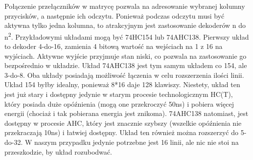 \documentclass{article}
\begin{document}
    Połączenie przełączników w matrycę pozwala na adresowanie wybranej kolumny przycisków, a następnie ich odczytu.
    Ponieważ podczas odczytu musi być aktywna tylko jedna kolumna, to atrakcyjnym jest zastosowanie dekoderów n do n\textsuperscript{2}.
    Przykładowymi układami mogą być 74HC154 lub 74AHC138. Pierwszy układ to dekoder 4-do-16, zamienia 4 bitową wartość
    na wejściach na 1 z 16 na wyjściach. Aktywne wyjście przyjmuje stan niski, co pozwala na zastosowanie go bezpośrednio w układzie.
    Układ 74AHC138 jest tym samym układem co 154, ale 3-do-8. Oba układy posiadają możliwość łączenia w celu rozszerzenia
    ilości linii. Układ 154 byłby idealny, ponieważ 8*16 daje 128 klawiszy. Niestety, układ ten jest już stary 
    i dostępny jedynie w starym procesie technologicznym HC(T), który posiada duże opóźnienia (mogą one przekroczyć 
    50ns) i pobiera więcej energii (chociaż i tak pobierana energia jest znikoma). 74AHC138 natomiast, jest dostępny
    w procesie AHC, który jest znacznie szybszy (wszelkie opóźnienia nie przekraczają 10ns) i łatwiej dostępny.
    Układ ten również można rozszerzyć do 5-do-32. W naszym przypadku jedynie potrzebne jest 16 linii, ale nic nie
    stoi na przeszkodzie, by układ rozubodwać.
    
\end{document}

